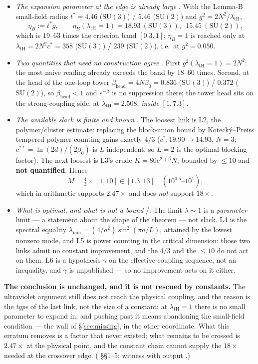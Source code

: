\begin{itemize}
\item \emph{The expansion parameter at the edge is already large} \LE. With the Lemma-B small-field
  radius $t^*=4.46$ ($\mathrm{SU}(3)$) / $5.46$ ($\mathrm{SU}(2)$) and
  $g^2=2N^2/\lambda_{\mathrm{tH}}$,
  \[
    \eta_B:=t^*g,\qquad
    \eta_B(\lambda_{\mathrm{tH}}=1)=18.93\ (\mathrm{SU}(3)),\ \;15.45\ (\mathrm{SU}(2)),
  \]
  which is $19$--$63$ times the criterion band $[0.3,1]$; $\eta_B=1$ is reached only at
  $\lambda_{\mathrm{tH}}=2N^2c^*=358$ ($\mathrm{SU}(3)$) / $239$ ($\mathrm{SU}(2)$), i.e.\ at
  $g^2=0.050$.
\item \emph{Two quantities that need no construction agree} \LE. First $g^2(\lambda_{\mathrm{tH}}
  =1)=2N^2$: the most naive reading already exceeds the band by $18$--$60$ times. Second, at the
  head of the one-loop tower $\beta_{\mathrm{head}}=4N\beta_0=0.836$ ($\mathrm{SU}(3)$) / $0.372$
  ($\mathrm{SU}(2)$), so $\beta_{\mathrm{head}}<1$ and $e^{-\beta}$ is no suppression there; the
  tower head sits on the strong-coupling side, at $\lambda_{\mathrm{tH}}=2.508$, \emph{inside}
  $[1,7.3]$.
\item \emph{The available slack is finite and known} \LM. The loosest link is L2, the polymer/cluster
  estimate: replacing the block-union bound by Koteck\'y--Preiss tempered polymer counting gains
  exactly $4/3$ ($c^*:19.90\to14.93$, $N=3$; $c^{**}=\ln(2d)/(2\beta_0)$ is $L$-independent, so
  $L=2$ is the optimal blocking factor). The next loosest is L3's crude
  $K=80e^{2+\beta}N$, bounded by $\le10$ and \textbf{not quantified}. Hence
  \[
    M=\tfrac43\times[1,10]\in[1.3,13]\quad(10^{0.5}\text{--}10^{1}),
  \]
  which in arithmetic supports $2.47\times$ and does \emph{not} support $18\times$.
\item \emph{What is optimal, and what is not a bound} \LT/\LM. The limit $\lambda\sim1$ is a
  \emph{parameter} limit --- a statement about the shape of the theorem --- not slack. L4 is the
  spectral equality $\lambda_{\min}=(4/a^2)\sin^2(\pi a/L)$, attained by the lowest nonzero mode,
  and L5 is power counting in the critical dimension: those two links admit no constant
  improvement, and the $4/3$ and the $\le10$ do not act on them. L6 is a hypothesis $\gamma$ on the
  effective-coupling sequence, not an inequality, and $\gamma$ is unpublished --- so no improvement
  acts on it either.
\end{itemize}
\textbf{The conclusion is unchanged, and it is not rescued by constants.} The ultraviolet argument
still does not reach the physical coupling, and the reason is the \emph{type} of the last link, not
the size of a constant: at $\lambda_{\mathrm{tH}}=1$ there is no small parameter to expand in, and
pushing past it means abandoning the small-field condition --- the wall of
\S\ref{sec:missing}, in the other coordinate. What this erratum removes is a factor that never
existed; what remains to be crossed is $2.47\times$ at the physical point, and the constant chain
cannot supply the $18\times$ needed at the crossover edge. \LM{}
( \S\S1--5; witness  with
output .)

